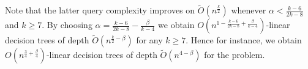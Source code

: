 Note that the latter query complexity improves on $\tilde{O}(n^{\frac{k}{2}})$
whenever \(\alpha < \frac{k-6}{2k-8}\) and $k\ge 7$.
By choosing $\alpha=\frac{k-6}{2k-8}-\frac{\beta}{k-4}$
we obtain $O(n^{1-\frac{k-6}{2k-8}+\frac{\beta}{k-4}})$-linear decision trees
of depth
$\tilde{O}(n^{\frac k2 - \beta})$
for any $k \ge 7$.
Hence for instance, we obtain
$O(n^{\frac{3}{4}+\frac{\beta}{4}})$-linear decision trees of depth
$\tilde{O}(n^{4-\beta})$ for the \dsum[8] problem.

